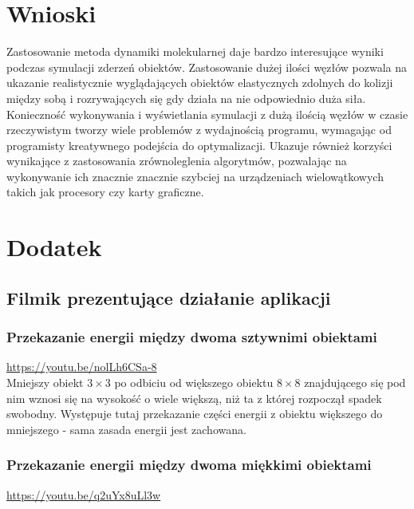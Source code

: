 \documentclass[12pt, letterpaper]{report}
\begin{document}
    \section{Wnioski}
    Zastosowanie metoda dynamiki molekularnej daje bardzo interesujące 
    wyniki podczas symulacji zderzeń obiektów. Zastosowanie dużej ilości węzłów pozwala na 
    ukazanie realistycznie wyglądających obiektów elastycznych zdolnych do kolizji między sobą 
    i rozrywających się gdy działa na nie odpowiednio duża siła. \\
    
    Konieczność wykonywania i wyświetlania symulacji z dużą ilością węzłów w czasie 
    rzeczywistym tworzy wiele problemów z wydajnością programu, wymagając
    od programisty kreatywnego podejścia do optymalizacji. Ukazuje również korzyści wynikające z 
    zastosowania zrównoleglenia algorytmów, pozwalając na wykonywanie ich znacznie znacznie szybciej na 
    urządzeniach wielowątkowych takich jak procesory czy karty graficzne.

    \section{Dodatek}
    \subsection{Filmik prezentujące działanie aplikacji}
    
    \subsubsection{Przekazanie energii między dwoma sztywnimi obiektami}
    \url{https://youtu.be/nolLh6CSa-8} \\

    Mniejszy obiekt $3 \times 3$ po odbiciu od większego obiektu $8 \times  8$ 
    znajdującego się  pod nim wznosi się na
    wysokość o wiele większą, niż ta z której rozpoczął spadek swobodny.
    Występuje tutaj przekazanie części energii z obiektu 
    większego do mniejszego - sama zasada energii jest zachowana.

    \subsubsection{Przekazanie energii między dwoma miękkimi obiektami}
    \url{https://youtu.be/q2uYx8uLl3w} \\
\end{document}
